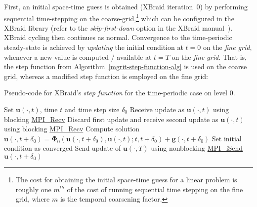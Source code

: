 \documentclass[3p]{elsarticle}
\begin{document}
First, an initial space-time guess is obtained ({XBraid} iteration~$0$)
by performing sequential time-stepping on the coarse-grid,\footnote{The
cost for obtaining the initial space-time guess for a linear problem
is roughly one $m^{th}$ of the cost
of running sequential time stepping on the fine grid, where $m$
is the temporal coarsening factor.}
which can be configured in the {XBraid} library
(refer to the \emph{skip-first-down} option in the {XBraid} manual~\cite{XBraid}).
{XBraid} cycling then continues as normal.
Convergence to the time-periodic steady-state is achieved
by \emph{updating} the initial condition at $t = 0$ on the \emph{fine grid},
whenever a new value is computed / available at $t = T$ on the \emph{fine grid}.
That is, the step function from Algorithm~\ref{mgrit-step-function-alg} is used on the coarse grid,
whereas a modified step function is employed on the fine grid:
\FloatBarrier
\begin{algorithm}
    \caption{Pseudo-code for {XBraid}'s \emph{step function} for the time-periodic case on level $0$.}
    \label{mgrit-step-function-time-periodic-alg}
    \begin{algorithmic}[1]
            \State Set $\boldsymbol{u} (\cdot, t)$, time $t$ and time step size $\delta_0$
            \label{mgrit-step-function-iter0-step}
                    \State Receive update as $\boldsymbol{u} (\cdot, t)$
                        using blocking \href{https://www.mpich.org/static/docs/v3.2/www3/MPI_Recv.html}{MPI\_Recv}
                        \label{mgrit-step-receive-first-update-step}
                    \label{mgrit-step-second-update-step}
                        \State Discard first update and receive second update as $\boldsymbol{u} (\cdot, t)$
                            using blocking \href{https://www.mpich.org/static/docs/v3.2/www3/MPI_Recv.html}{MPI\_Recv}
                    \EndIf
                \EndIf
            \EndIf
            \State Compute solution
                $\boldsymbol{u} (\cdot, t + \delta_0)
                = \boldsymbol{\Phi}_0 \left( \boldsymbol{u} (\cdot, t + \delta_0), \boldsymbol{u} (\cdot, t); t, t + \delta_0 \right)
                + \boldsymbol{g} (\cdot, t + \delta_0)$ \label{mgrit-step-integration-step}
                    \label{mgrit-step-function-tol-step}
                        \State Set initial condition as converged
                    \EndIf
                    \State Send update of $\boldsymbol{u} (\cdot, T)$ using nonblocking
                    \href{https://www.mpich.org/static/docs/v3.2/www3/MPI_Isend.html}{MPI\_iSend}
                    \label{mgrit-step-send-update-step}
                \EndIf
            \EndIf
            \State\Return $\boldsymbol{u} (\cdot, t + \delta_0)$ \label{mgrit-step-return-step}
        \EndFunction
    \end{algorithmic}
\end{algorithm}
\FloatBarrier
\end{document}
